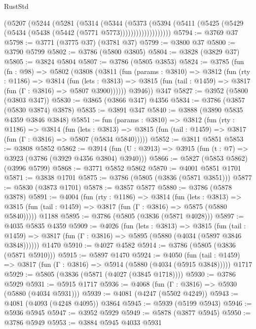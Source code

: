 \begin{lexlean}{RustStd}
\begin{coremodule}
              (@5207
                (@5244
                  (@5281
                    (@5314
                      (@5344
                        (@5373
                          (@5394
                            (@5411
                              (@5425 (@5429 (@5434 (@5438 (@5442 (@5771 @5773)))))))))))))))))))
@5794 := @3769 @37
@5798 := @3771 (@3775 @37) (@3781 @37)
@5799 := @3800 @37
@5800 := @3790 @5799
@5802 := @3786 (@5800 @3805)
@5804 := @3828 (@3829 @37)
@5805 := @3824 @5804
@5807 := @3786 (@5805 @3853)
@5824 := @3785
    (fun (fn : @98) =>
    @5802
      (@3808
        (@3811
          (fun (params : @3810) =>
          @3812
            (fun (rty : @1186) =>
            @3814
              (fun (lets : @3813) =>
              @3815 (fun (tail : @1459) => @3817 (fun (Γ : @3816) => @5807 @3900))))))
        @3946))
    @347
@5827 := @3952 (@5800 (@3803 @347))
@5830 := @3865 (@3866 @347) @4356
@5834 := @3786 (@3857 (@5830 @3874) @3878)
@5835 := @3891 @347
@5840 := @3888 (@3890 @5835 @4359 @3846 @3848)
@5851 := fun (params : @3810) =>
  @3812
    (fun (rty : @1186) =>
    @3814
      (fun (lets : @3813) =>
      @3815 (fun (tail : @1459) => @3817 (fun (Γ : @3816) => @5807 (@5834 @5840)))))
@5852 := @3811 @5851
@5853 := @3808 @5852
@5862 := @3914 (fun (U : @3913) => @3915 (fun (t : @7) => @3923 (@3786 (@3929 @4356 @3804) @3940)))
@5866 := @5827 (@5853 @5862) (@3996 @5799)
@5868 := @3771 @5852 @5862
@5870 := @4001 @5851 @1701
@5871 := @3838 @1701
@5875 := @3786 (@5805 (@3836 (@5871 @3851)))
@5877 := @5830 (@3873 @1701)
@5878 := @3857 @5877
@5880 := @3786 (@5878 @3878)
@5891 := @4004
    (fun (rty : @1186) =>
    @3814
      (fun (lets : @3813) =>
      @3815 (fun (tail : @1459) => @3817 (fun (Γ : @3816) => @5875 (@5880 @5840)))))
    @1188
@5895 := @3786 (@5805 (@3836 (@5871 @4028)))
@5897 := @4035 @5835 @4359
@5909 := @4026
    (fun (lets : @3813) =>
    @3815
      (fun (tail : @1459) => @3817 (fun (Γ : @3816) => @5895 (@5880 (@4034 (@5897 @3846 @3848))))))
    @1470
@5910 := @4027 @4582
@5914 := @3786 (@5805 (@3836 (@5871 @5910)))
@5915 := @5897 @1470
@5924 := @4050
    (fun (tail : @1459) => @3817 (fun (Γ : @3816) => @5914 (@5880 (@4034 (@5915 @3848)))))
    @1717
@5929 := @5805 (@3836 (@5871 (@4027 (@3845 @1718))))
@5930 := @3786 @5929
@5931 := @5915 @1717
@5936 := @4068 (fun (Γ : @3816) => @5930 (@5880 (@4034 @5931)))
@5939 := @4081 (@4247 (@5502 @4249))
@5943 := @4081 (@4093 (@4248 @4095)) @3864
@5945 := @5939 (@5199 @5943)
@5946 := @5936 @5945
@5947 := @3952 @5929
@5949 := @5878 (@3877 @5945)
@5950 := @3786 @5949
@5953 := @3884 @5945 @4033 @5931

\end{coremodule}
\end{lexlean}

